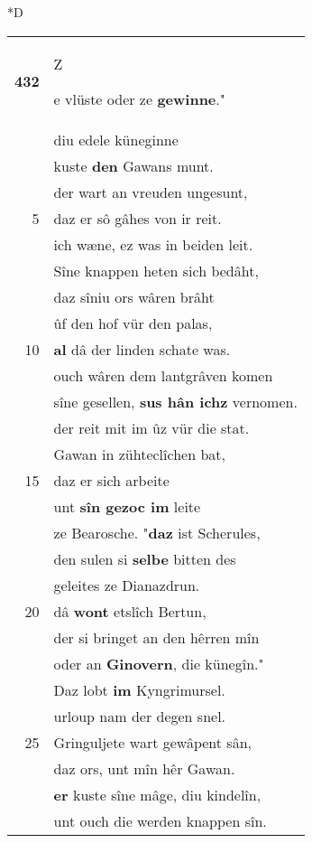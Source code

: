 \documentclass[8pt,a4paper,notitlepage]{article}
\begin{document}
\begin{table}[ht]
\begin{minipage}[t]{0.5\linewidth}
\small
\begin{center}*D
\end{center}
\begin{tabular}{rl}
\textbf{432} & \begin{large}Z\end{large}e vlüste oder ze \textbf{gewinne}."\\ 
 & diu edele küneginne\\ 
 & kuste \textbf{den} Gawans munt.\\ 
 & der wart an vreuden ungesunt,\\ 
5 & daz er sô gâhes von ir reit.\\ 
 & ich wæne, ez was in beiden leit.\\ 
 & Sîne knappen heten sich bedâht,\\ 
 & daz sîniu ors wâren brâht\\ 
 & ûf den hof vür den palas,\\ 
10 & \textbf{al} dâ der linden schate was.\\ 
 & ouch wâren dem lantgrâven komen\\ 
 & sîne gesellen, \textbf{sus hân ichz} vernomen.\\ 
 & der reit mit im ûz vür die stat.\\ 
 & Gawan in zühteclîchen bat,\\ 
15 & daz er sich arbeite\\ 
 & unt \textbf{sîn gezoc im} leite\\ 
 & ze Bearosche. "\textbf{daz} ist Scherules,\\ 
 & den sulen si \textbf{selbe} bitten des\\ 
 & geleites ze Dianazdrun.\\ 
20 & dâ \textbf{wont} etslîch Bertun,\\ 
 & der si bringet an den hêrren mîn\\ 
 & oder an \textbf{Ginovern}, die künegîn."\\ 
 & Daz lobt \textbf{im} Kyngrimursel.\\ 
 & urloup nam der degen snel.\\ 
25 & Gringuljete wart gewâpent sân,\\ 
 & daz ors, unt mîn hêr Gawan.\\ 
 & \textbf{er} kuste sîne mâge, diu kindelîn,\\ 
 & unt ouch die werden knappen sîn.\\ 

\end{tabular}
\end{minipage}
\end{table}
\end{document}
